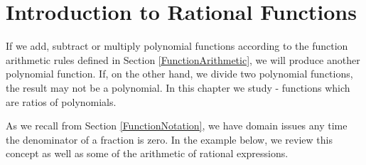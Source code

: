 \section{Introduction to Rational Functions}
\label{IntroRational}

If we add, subtract or multiply polynomial functions according to the function arithmetic rules defined in Section \ref{FunctionArithmetic}, we will produce another polynomial function. If, on the other hand, we divide two polynomial functions, the result may not be a polynomial.  In this chapter we study   - functions which are ratios of polynomials.

\smallskip



\smallskip

As we recall from Section \ref{FunctionNotation}, we have domain issues any time the denominator of a fraction is zero.  In the example below, we review this concept as well as some of the arithmetic of rational expressions.

\medskip

